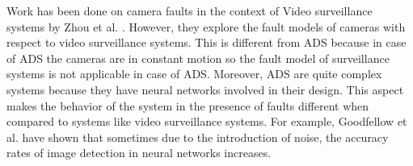 Work has been done on camera faults in the context of Video surveillance systems by Zhou et al. \cite{Zhou}. However, they explore the fault models of cameras with respect to video surveillance systems. This is different from ADS because in case of ADS the cameras are in constant motion so the fault model of surveillance systems is not applicable in case of ADS. Moreover, ADS are quite complex systems because they have neural networks involved in their design. This aspect makes the behavior of the system in the presence of faults different when compared to systems like video surveillance systems. For example, Goodfellow et al. \cite{Goodfellow} have shown that sometimes due to the introduction of noise, the accuracy rates of image detection in neural networks increases.